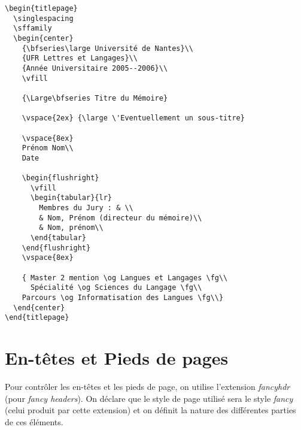 \begin{footnotesize}
\begin{verbatim}
\begin{titlepage}
  \singlespacing
  \sffamily
  \begin{center}
    {\bfseries\large Université de Nantes}\\
    {UFR Lettres et Langages}\\
    {Année Universitaire 2005--2006}\\
    \vfill

    {\Large\bfseries Titre du Mémoire}

    \vspace{2ex} {\large \'Eventuellement un sous-titre}
     
    \vspace{8ex}
    Prénom Nom\\
    Date

    \begin{flushright}
      \vfill
      \begin{tabular}{lr}
        Membres du Jury : & \\
        & Nom, Prénom (directeur du mémoire)\\
        & Nom, prénom\\
      \end{tabular}
    \end{flushright}
    \vspace{8ex}
    
    { Master 2 mention \og Langues et Langages \fg\\
      Spécialité \og Sciences du Langage \fg\\
    Parcours \og Informatisation des Langues \fg\\}
  \end{center}
\end{titlepage}
\end{verbatim}
\end{footnotesize}




\section{En-têtes et Pieds de pages}

Pour contrôler les en-têtes et les pieds de page, on utilise
l'extension \emph{fancyhdr} (pour \emph{fancy headers}). On déclare
que le style de page utilisé sera le style \emph{fancy} (celui produit
par cette extension) et on définit la nature des différentes parties
de ces éléments.

